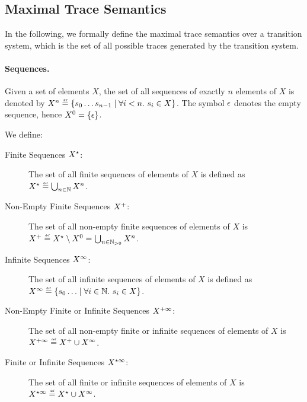 \subsection{Maximal Trace Semantics}

In the following, we formally define the maximal trace semantics over a transition system, which is the set of all possible traces generated by the transition system.

\paragraph{Sequences.}
Given a set of elements $X$, the set of all sequences of exactly $n$ elements of $X$ is denoted by $X^n\defeq\setdef{\defstate_0 \dots \defstate_{n-1}}{\forall i < n.\spacer s_i \in X}$.
The symbol $\epsilon$ denotes the empty sequence, hence $X^0 = \{\epsilon\}$.

We define:
\begin{description}
  \item[Finite Sequences $X^\star$:] The set of all finite sequences of elements of $X$ is defined as $\retrievefiniteoremptytraces{X} \defeq \bigsetjoin_{n \in \N} X^n$.
  \item[Non-Empty Finite Sequences $X^+$:] The set of all non-empty finite sequences of elements of $X$ is $\retrievefinitetraces{X} \defeq \retrievefiniteoremptytraces{X} \setminus X^0 = \bigsetjoin_{n \in \Nposstrict} X^n$.
  \item[Infinite Sequences $X^\infty$:] The set of all infinite sequences of elements of $X$ is defined as  $\retrieveinfinitetraces{X} \defeq \setdef{\defstate_0 \dots}{\forall i \in \N.\spacer \defstate_i \in X}$.
  \item[Non-Empty Finite or Infinite Sequences $X^{+\infty}$:] The set of all non-empty finite or infinite sequences of elements of $X$ is $\retrievefiniteinfinitetraces{X} \defeq \retrievefinitetraces{X} \cup \retrieveinfinitetraces{X}$.
  \item[Finite or Infinite Sequences $X^{\star\infty}$:] The set of all finite or infinite sequences of elements of $X$ is $\retrievefiniteoremptyinfinitetraces{X} \defeq \retrievefiniteoremptytraces{X} \cup \retrieveinfinitetraces{X}$.
\end{description}

